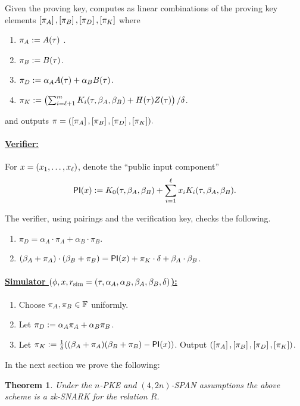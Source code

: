 \documentclass[11pt]{article}
\numberwithin{figure}{section} %
\newtheorem{thm}{Theorem}[section]
\begin{document}
Given the proving key, \per computes as linear combinations of the proving key elements $\left[\pi_A\right],\left[\pi_B\right],\left[\pi_D\right],\left[\pi_K\right]$  where 
\begin{enumerate}
\item $\pi_A:= A(\tau)$ .
\item $\pi_B:= B(\tau)$.
\item $\pi_D:= \alpha_A A(\tau) + \alpha_B B(\tau)$.
\item $\pi_K:= \left(\sum_{i=\ell+1}^m K_i(\tau,\beta_A,\beta_B)+ H(\tau)Z(\tau)\right)/\delta$.
\end{enumerate}
 and outputs $\pi = (\left[\pi_A\right],\left[\pi_B\right],\left[\pi_D\right],\left[\pi_K\right]).$
 

\paragraph{\underline{Verifier:}\\}
For $x=(x_1,\ldots,x_\ell)$, denote the ``public input component'' 
\[ \mathsf{PI}(x) := K_0(\tau,\beta_A,\beta_B) + \sum_{i=1}^\ell x_i  K_i(\tau,\beta_A,\beta_B) .\]

 The verifier, using pairings and the verification key, checks the following.
\begin{enumerate}
\item $\pi_D = \alpha_A\cdot \pi_A + \alpha_B \cdot \pi_B$.
\item $(\beta_A +\pi_A)\cdot (\beta_B + \pi_B) = \mathsf{PI}(x) + \pi_K\cdot \delta + \beta_A\cdot \beta_B$.
 \end{enumerate}
\paragraph{\underline{Simulator $(\phi,x,r_{\mathrm{sim}}=(\tau,\alpha_A,\alpha_B,\beta_A,\beta_B,\delta)$):}\\}
\begin{enumerate}
 \item Choose $\pi_A,\pi_B\in\mathbb F$ uniformly.
 \item Let $\pi_D := \alpha_A\pi_A + \alpha_B\pi_B$.
 \item Let $\pi_K := \frac{1}{\delta}((\beta_A + \pi_A)(\beta_B + \pi_B)-\mathsf{PI}(x))$.
 Output $(\left[\pi_A\right],\left[\pi_B\right],\left[\pi_D\right],\left[\pi_K\right])$.
 \end{enumerate}

 In the next section we prove the following:
 \begin{thm}\label{thm:snarkSecure}
  Under the $n$-PKE and $(4,2n)$-SPAN assumptions the above scheme is a zk-SNARK for the relation $R$. 
 \end{thm}
\end{document}
